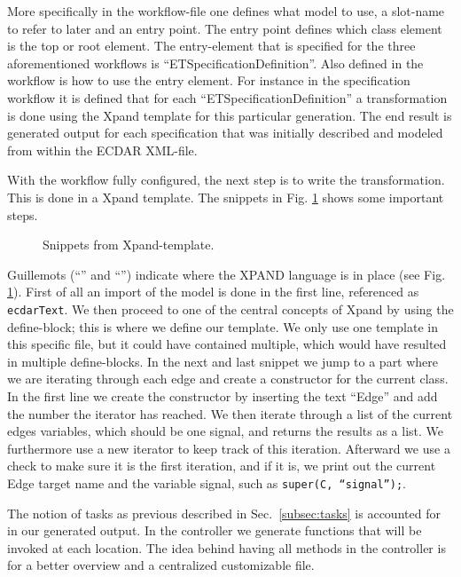 More specifically in the workflow-file one defines what model to use, a
slot-name to refer to later and an entry point. The entry point defines which
class element is the top or root element. The entry-element that is specified for
the three aforementioned workflows is ``ETSpecificationDefinition''. Also defined
in the workflow is how to use the entry element. For instance in the
specification workflow it is defined that for each ``ETSpecificationDefinition'' a
transformation is done using the Xpand template for this particular
generation. The end result is generated output for each specification that
was initially described and modeled from within the ECDAR XML-file.

With the workflow fully configured, the next step is to write the
transformation. This is done in a Xpand template. The snippets in Fig.
\ref{xpand-example} shows some important steps.

\begin{figure}[t]



\caption{Snippets from Xpand-template.}
\label{xpand-example}
\end{figure}

Guillemots (``\guillemotleft'' and ``\guillemotright'') indicate where the
XPAND language is in place (see Fig. \ref{xpand-example}). First of all an
import of the model is done in the first line, referenced as \texttt{ecdarText}. We then
proceed to one of the central concepts of Xpand by using the define-block; this
is where we define our template. We only use one template in this specific file,
but it could have contained multiple, which would have resulted in multiple
define-blocks. In the next and last snippet we jump to a part where we are
iterating through each edge and create a constructor for the current class. In
the first line we create the constructor by inserting the text ``Edge'' and add
the number the iterator has reached. We then iterate through a list of the
current edges variables, which should be one signal, and returns the results as
a list. We furthermore use a new iterator to keep track of this
iteration. Afterward we use a check to make sure it is the first iteration, and
if it is, we print out the current Edge target name and the variable signal,
such as \texttt{super(C, ``signal'');}.

The notion of tasks as previous described in Sec.~\ref{subsec:tasks} is accounted for in
our generated output. In the controller we generate functions that will be
invoked at each location. The idea behind having all methods in the
controller is for a better overview and a centralized customizable file.
